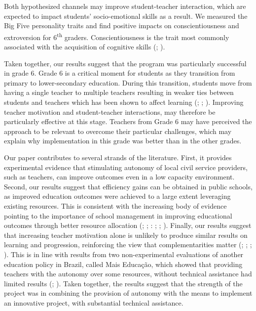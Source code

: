 \documentclass[11pt,a4paper]{article}
\begin{document}
	Both hypothesized channels may improve student-teacher interaction, which are expected to impact students' socio-emotional skills as a result. We measured the Big Five personality traits and find positive impacts on conscientiousness and extroversion for 6\textsuperscript{th} graders. Conscientiousness is the trait most commonly associated with the acquisition of cognitive skills (\citealp{poropat2009meta}; \citealp{ivcevic2014predicting}). 
	
	Taken together, our results suggest that the program was particularly successful in grade 6. Grade 6 is a critical moment for students as they transition from primary to lower-secondary education. During this transition, students move from having a single teacher to multiple teachers resulting in weaker ties between students and teachers which has been shown to affect learning (\citealp{bedard2005middle}; \citealp{hanewald2013transition}; \citealp{Santos2017}). Improving teacher motivation and student-teacher interactions, may therefore be particularly effective at this stage. Teachers from Grade 6 may have perceived the approach to be relevant to overcome their particular challenges, which may explain why implementation in this grade was better than in the other grades.    
	
	
	Our paper contributes to several strands of the literature. First, it provides experimental evidence that stimulating autonomy of local civil service providers, such as teachers, can improve outcomes even in a low capacity environment. Second, our results suggest that efficiency gains can be obtained in public schools, as improved education outcomes were achieved to a large extent leveraging existing resources. This is consistent with the increasing body of evidence pointing to the importance of school management in improving educational outcomes through better resource allocation (\citealp{abdulkadirouglu2011accountability}; \citealp{dobbie2013getting}; \citealp{rockoff2012information}: \citealp{taylor2012effect}; \citealp{fryer2014injecting}; \citealp{fryer2017management}). Finally, our results suggest that increasing teacher motivation alone is unlikely to produce similar results on learning and progression, reinforcing the view that complementarities matter (\citealp{WDR2018}; \citealp{gilligan2018educator}; \citealp{andrew2019preschool}; \citealp{mbiti2019inputs}). This is in line with results from two non-experimental evaluations of another education policy in Brazil, called  Mais Educação, which showed that providing teachers with the autonomy over some resources, without technical assistance had limited results (\citealp{almeida2016assessing}; \citealp{de2016impacto}). Taken together, the results suggest that the strength of the project was in combining the provision of autonomy with the means to implement an innovative project, with substantial technical assistance.  
	
\end{document}
